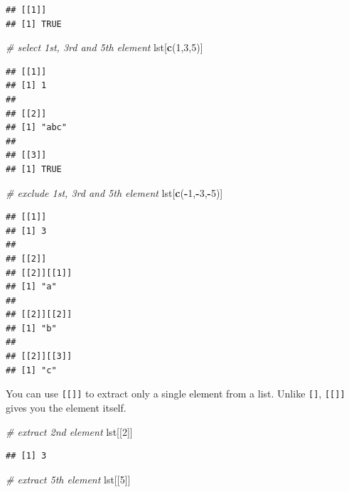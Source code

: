 \documentclass[
]{book}
\newenvironment{Shaded}{\begin{snugshade}}{\end{snugshade}}
\newcommand{\CommentTok}[1]{\textcolor[rgb]{0.56,0.35,0.01}{\textit{#1}}}
\newcommand{\DecValTok}[1]{\textcolor[rgb]{0.00,0.00,0.81}{#1}}
\newcommand{\KeywordTok}[1]{\textcolor[rgb]{0.13,0.29,0.53}{\textbf{#1}}}
\newcommand{\NormalTok}[1]{#1}
\newcommand{\OperatorTok}[1]{\textcolor[rgb]{0.81,0.36,0.00}{\textbf{#1}}}
\begin{document}
\begin{verbatim}
## [[1]]
## [1] TRUE
\end{verbatim}

\begin{Shaded}
\begin{Highlighting}[]
\CommentTok{# select 1st, 3rd and 5th element}
\NormalTok{lst[}\KeywordTok{c}\NormalTok{(}\DecValTok{1}\NormalTok{,}\DecValTok{3}\NormalTok{,}\DecValTok{5}\NormalTok{)]}
\end{Highlighting}
\end{Shaded}

\begin{verbatim}
## [[1]]
## [1] 1
## 
## [[2]]
## [1] "abc"
## 
## [[3]]
## [1] TRUE
\end{verbatim}

\begin{Shaded}
\begin{Highlighting}[]
\CommentTok{# exclude 1st, 3rd and 5th element}
\NormalTok{lst[}\KeywordTok{c}\NormalTok{(}\OperatorTok{-}\DecValTok{1}\NormalTok{,}\OperatorTok{-}\DecValTok{3}\NormalTok{,}\OperatorTok{-}\DecValTok{5}\NormalTok{)]}
\end{Highlighting}
\end{Shaded}

\begin{verbatim}
## [[1]]
## [1] 3
## 
## [[2]]
## [[2]][[1]]
## [1] "a"
## 
## [[2]][[2]]
## [1] "b"
## 
## [[2]][[3]]
## [1] "c"
\end{verbatim}

You can use \texttt{{[}{[}{]}{]}} to extract only a single element from a list. Unlike \texttt{{[}{]}}, \texttt{{[}{[}{]}{]}} gives you the element itself.

\begin{Shaded}
\begin{Highlighting}[]
\CommentTok{# extract 2nd element}
\NormalTok{lst[[}\DecValTok{2}\NormalTok{]]}
\end{Highlighting}
\end{Shaded}

\begin{verbatim}
## [1] 3
\end{verbatim}

\begin{Shaded}
\begin{Highlighting}[]
\CommentTok{# extract 5th element}
\NormalTok{lst[[}\DecValTok{5}\NormalTok{]]}
\end{Highlighting}
\end{Shaded}
\end{document}
